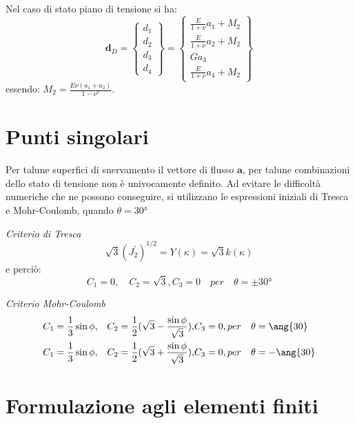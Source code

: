 Nel caso di stato piano di tensione si ha:
\[
\mathbf{d}_D =
\begin{Bmatrix}
	d_1 \\
	d_2 \\
	d_3 \\
	d_4
\end{Bmatrix}
=
\begin{Bmatrix}
	\frac{E}{1 + \nu}a_1 + M_2 \\
	\frac{E}{1 + \nu}a_2 + M_2 \\
	Ga_3 \\
	\frac{E}{1 + \nu}a_4 + M_2
\end{Bmatrix}
\]
essendo: $M_2 = \frac{E\nu(a_1+a_2)}{1-\nu^2}$.

\section{Punti singolari}
Per talune superfici di snervamento il vettore di flusso $\mathbf{a}$, per talune combinazioni dello stato di tensione non è univocamente definito. Ad evitare le difficoltà numeriche che ne possono conseguire, si utilizzano le espressioni iniziali di Tresca e Mohr-Coulomb, quando $\theta = \ang{30}$

\emph{Criterio di Tresca}
\begin{equation}
	\sqrt{3}(J_2^{'})^{1/2} = Y(\kappa) = \sqrt{3} k(\kappa)
\end{equation}
e perciò:
\begin{equation}
	C_1=0, \quad C_2=\sqrt{3}, C_3=0 \quad per \quad \theta = \pm \ang{30}
\end{equation}

\emph{Criterio Mohr-Coulomb}
\begin{align}
	C_1 & = \frac{1}{3} \sin \phi, & C_2 = \frac{1}{2}(\sqrt{3} - \frac{\sin \phi}{\sqrt{3}} ), & C_3 = 0, per \quad \theta = \ang{30}	\notag \\
	C_1 & = \frac{1}{3} \sin \phi, & C_2  = \frac{1}{2}(\sqrt{3} + \frac{\sin \phi}{\sqrt{3}} ), & C_3 = 0, per \quad \theta = - \ang{30}
\end{align}

\section{Formulazione agli elementi finiti}


